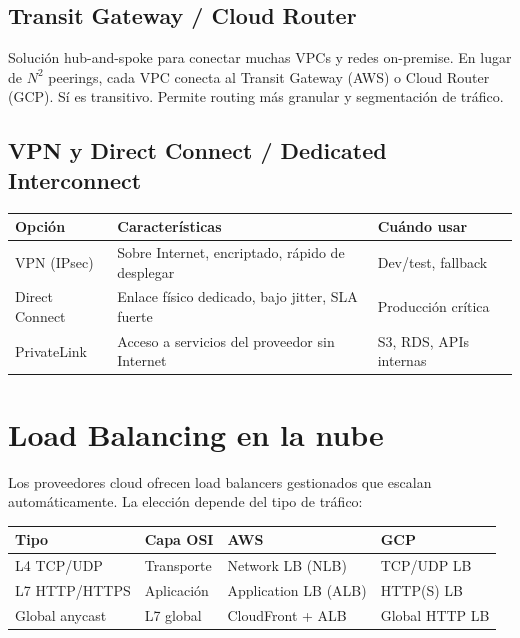 \subsection{Transit Gateway / Cloud Router}

\begin{concepto}
Solución hub-and-spoke para conectar muchas VPCs y redes on-premise. En lugar de
$N^2$ peerings, cada VPC conecta al Transit Gateway (AWS) o Cloud Router (GCP).
Sí es transitivo. Permite routing más granular y segmentación de tráfico.
\end{concepto}

\subsection{VPN y Direct Connect / Dedicated Interconnect}

\begin{center}
\begin{tabular}{lll}
\toprule
\textbf{Opción} & \textbf{Características} & \textbf{Cuándo usar} \\
\midrule
VPN (IPsec)       & Sobre Internet, encriptado, rápido de desplegar & Dev/test, fallback \\
Direct Connect    & Enlace físico dedicado, bajo jitter, SLA fuerte & Producción crítica \\
PrivateLink       & Acceso a servicios del proveedor sin Internet     & S3, RDS, APIs internas \\
\bottomrule
\end{tabular}
\end{center}

\section{ Load Balancing en la nube}

\begin{concepto}
Los proveedores cloud ofrecen load balancers gestionados que escalan automáticamente.
La elección depende del tipo de tráfico:
\end{concepto}

\begin{center}
\begin{tabular}{llll}
\toprule
\textbf{Tipo} & \textbf{Capa OSI} & \textbf{AWS} & \textbf{GCP} \\
\midrule
L4 TCP/UDP    & Transporte & Network LB (NLB)    & TCP/UDP LB \\
L7 HTTP/HTTPS & Aplicación & Application LB (ALB) & HTTP(S) LB \\
Global anycast & L7 global & CloudFront + ALB     & Global HTTP LB \\
\bottomrule
\end{tabular}
\end{center}

